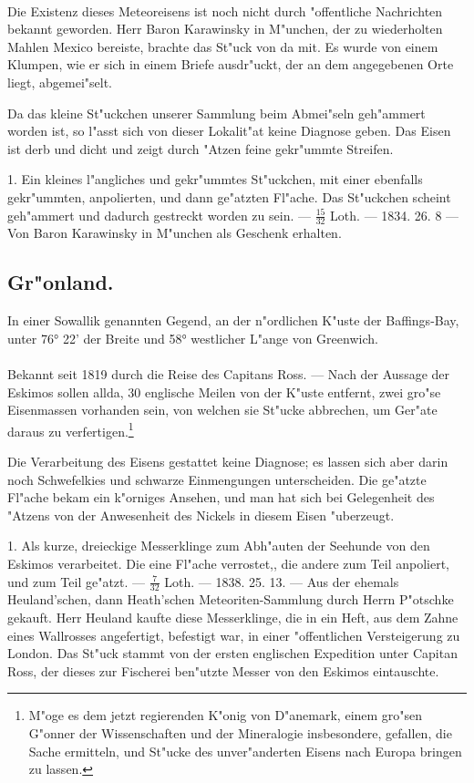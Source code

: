 \documentclass[a4paper, 11pt, oneside, polutonikogreek, german]{article}
\begin{document}
\paragraph{}
Die Existenz dieses Meteoreisens ist noch nicht durch "offentliche Nachrichten bekannt geworden. Herr Baron Karawinsky in M"unchen, der zu wiederholten Mahlen Mexico bereiste, brachte das St"uck von da mit. Es wurde von einem Klumpen, wie er sich in einem Briefe ausdr"uckt, der an dem angegebenen Orte liegt, abgemei"selt.

Da das kleine St"uckchen unserer Sammlung beim Abmei"seln geh"ammert worden ist, so l"asst sich von dieser Lokalit"at keine Diagnose geben. Das Eisen ist derb und dicht und zeigt durch "Atzen feine gekr"ummte Streifen.

1. Ein kleines l"angliches und gekr"ummtes St"uckchen, mit einer ebenfalls gekr"ummten, anpolierten, und dann ge"atzten Fl"ache. Das St"uckchen scheint geh"ammert und dadurch gestreckt worden zu sein. --- $\frac{15}{32}$ Loth. --- 1834. 26. 8 --- Von Baron Karawinsky in M"unchen als Geschenk erhalten.
\subsection{Gr"onland.}
\begin{center}
\small
In einer Sowallik genannten Gegend, an der n"ordlichen K"uste der Baffings-Bay, unter 76° 22' der Breite und 58° westlicher L"ange von Greenwich.
\end{center}
\paragraph{}
Bekannt seit 1819 durch die Reise des Capitans Ross. --- Nach der Aussage der Eskimos sollen allda, 30 englische Meilen von der K"uste entfernt, zwei gro"se Eisenmassen vorhanden sein, von welchen sie St"ucke abbrechen, um Ger"ate daraus zu verfertigen.\footnote{M"oge es dem jetzt regierenden K"onig von D"anemark, einem gro"sen G"onner der Wissenschaften und der Mineralogie insbesondere, gefallen, die Sache ermitteln, und St"ucke des unver"anderten Eisens nach Europa bringen zu lassen.}

Die Verarbeitung des Eisens gestattet keine Diagnose; es lassen sich aber darin noch Schwefelkies und schwarze Einmengungen unterscheiden. Die ge"atzte Fl"ache bekam ein k"orniges Ansehen, und man hat sich bei Gelegenheit des "Atzens von der Anwesenheit des Nickels in diesem Eisen "uberzeugt.

1. Als kurze, dreieckige Messerklinge zum Abh"auten der Seehunde von den Eskimos verarbeitet. Die eine Fl"ache verrostet,, die andere zum Teil anpoliert, und zum Teil ge"atzt. --- $\frac{7}{32}$ Loth. --- 1838. 25. 13. --- Aus der ehemals Heuland'schen, dann Heath'schen Meteoriten-Sammlung durch Herrn P"otschke gekauft. Herr Heuland kaufte diese Messerklinge, die in ein Heft, aus dem Zahne eines Wallrosses angefertigt, befestigt war, in einer "offentlichen Versteigerung zu London. Das St"uck stammt von der ersten englischen Expedition unter Capitan Ross, der dieses zur Fischerei ben"utzte Messer von den Eskimos eintauschte.
\clearpage
\end{document}
